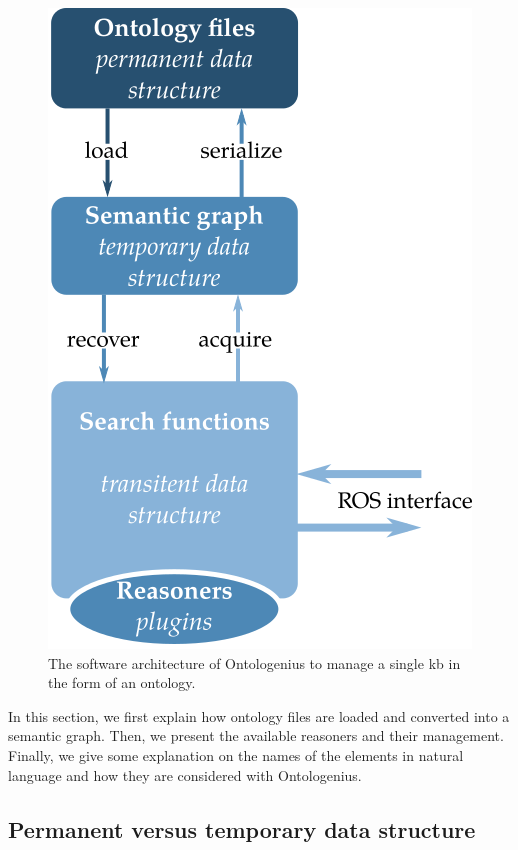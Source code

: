 \begin{figure}[ht!]
\centering
\includegraphics[scale=0.5]{figures/chapter2/archi_single.png}
\caption{\label{fig:chap2_archi_single} The software architecture of Ontologenius to manage a single \acrlong{kb} in the form of an ontology.}
\end{figure}

In this section, we first explain how ontology files are loaded and converted into a semantic graph. Then, we present the available reasoners and their management. Finally, we give some explanation on the names of the elements in natural language and how they are considered with Ontologenius.

\subsection{Permanent versus temporary data structure}

